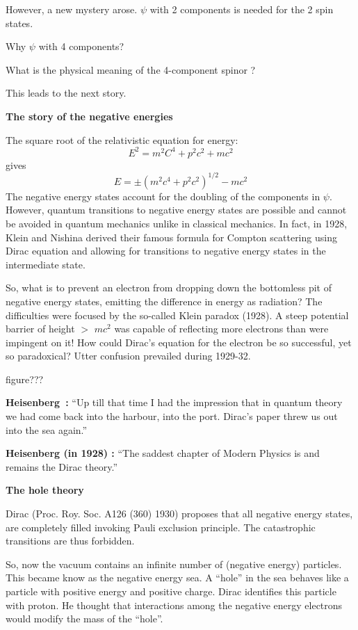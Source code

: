 However, a new mystery arose. $\psi$ with 2 components is needed for the 2 spin states.

Why $\psi$ with 4 components?

What is the physical meaning of the 4-component spinor ?

This leads to the next story.

\textbf{The story of the negative energies}

The square root of the relativistic equation for energy:
$$
E^{2} = m^{2} C^{4} + p^{2} c^{2} + mc^{2}
$$
gives
$$
E = \pm (m^{2} c^{4} + p^{2} c^{2})^{1/2} - mc^{2} 
$$
The negative energy states account for the doubling of the components in $\psi$. However, quantum transitions to negative energy states are possible and cannot be avoided in quantum mechanics unlike in classical mechanics. In fact, in 1928, Klein and Nishina derived their famous formula for Compton scattering using Dirac equation and allowing for transitions to negative energy states in the intermediate state.

So, what is to prevent an electron from dropping down the bottomless pit of negative energy states, emitting the difference in energy as radiation? The difficulties were focused by the so-called Klein paradox (1928). A steep potential barrier of height $>$ $mc^{2}$ was capable of reflecting more electrons than were impingent on it! How could Dirac’s equation for the electron be so successful, yet so paradoxical? Utter confusion prevailed during 1929-32.

figure???

\textbf{Heisenberg~:}	“Up till that time I had the impression that in quantum theory we had come back into the harbour, into the port. Dirac’s paper threw us out into the sea again.”

\textbf{Heisenberg (in 1928) :}	“The saddest chapter of Modern Physics is and remains the Dirac theory.”

\textbf{The hole theory}

Dirac (Proc. Roy. Soc. A126 (360) 1930) proposes that all negative energy states, are completely filled invoking Pauli exclusion principle. The catastrophic transitions are thus forbidden.
	
So, now the vacuum contains an infinite number of (negative energy) particles. This became know as the negative energy sea. A “hole” in the sea behaves like a particle with positive energy and positive charge. Dirac identifies this particle with proton. He thought that interactions among the negative energy electrons would modify the mass of the “hole”.

